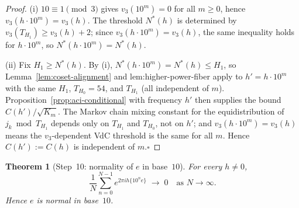 \documentclass[
]{article}
\newtheorem{theorem}{Theorem}[section]
\begin{document}
\begin{proof}
(i) $10\equiv 1\pmod 3$ gives $v_3(10^m)=0$ for all $m\ge 0$, hence
$v_3(h\cdot 10^m)=v_3(h)$.
The threshold $N^*(h)$ is determined by $v_3(T_{H_1})\ge v_3(h)+2$; since
$v_3(h\cdot 10^m)=v_3(h)$, the same inequality holds for $h\cdot 10^m$,
so $N^*(h\cdot 10^m)=N^*(h)$.

(ii) Fix $H_1\ge N^*(h)$.  By (i), $N^*(h\cdot 10^m)=N^*(h)\le H_1$,
so Lemma~\ref{lem:coset-alignment} and lem:higher-power-fiber apply to
$h'=h\cdot 10^m$ with the same $H_1$, $T_{H_0}=54$, and $T_{H_1}$
(all independent of $m$).  Proposition~\ref{prop:aci-conditional} with
frequency $h'$ then supplies the bound $C(h')/\sqrt{K_m}$.  The Markov
chain mixing constant for the equidistribution of $j_k\bmod T_{H_1}$
depends only on $T_{H_1}$ and $T_{H_0}$, not on $h'$; and $v_3(h\cdot 10^m)
=v_3(h)$ means the $v_3$-dependent VdC threshold is the same for all $m$.
Hence $C(h'):=C(h)$ is independent of $m$.\hfill$\square$
\end{proof}

\begin{theorem}[Step~10: normality of $e$ in base~$10$]\label{thm:normality-full}
For every $h\ne 0$,
\[
  \frac{1}{N}\sum_{n=0}^{N-1} e^{2\pi ih\{10^n e\}} \;\longrightarrow\; 0
  \quad\text{as }N\to\infty.
\]
Hence $e$ is normal in base~$10$.
\end{theorem}
\end{document}

